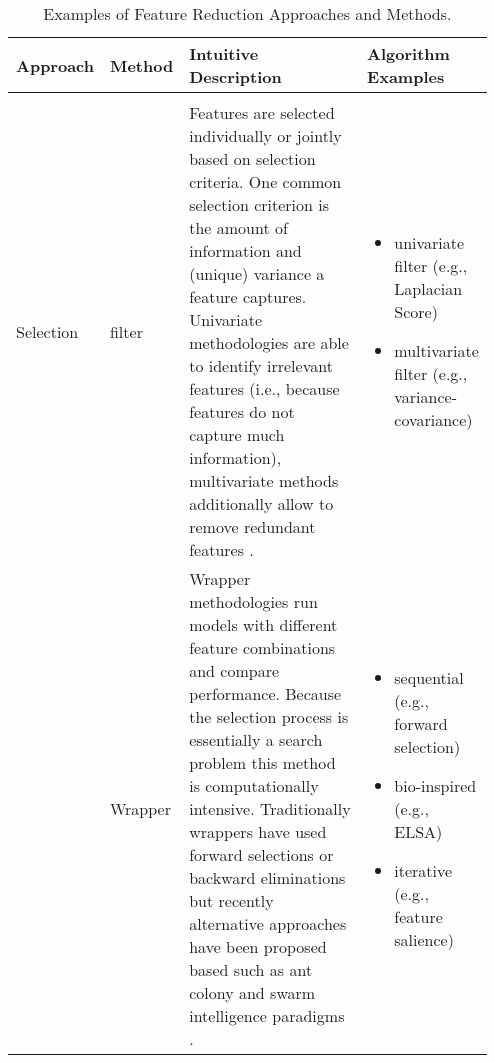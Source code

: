 \begin{sidewaystable*}[!hbtp]
    \centering
    \caption{Examples of Feature Reduction Approaches and Methods.}
    \label{tab:featureReduction} 
    \begin{tabular}{
    >{\raggedright\arraybackslash}p{0.08\linewidth} 
    >{\raggedright\arraybackslash}p{0.08\linewidth} 
    >{\raggedright\arraybackslash}p{0.54\linewidth} 
    >{\raggedright\arraybackslash}p{0.25\linewidth}
    }
        \hline 
        Approach & Method & Intuitive Description & Algorithm Examples \\ 
        \hline \\ [-0.5em]
        
        Selection \linebreak & 
        filter \linebreak & 
        Features are selected individually or jointly based on selection criteria. One common selection criterion is the amount of information and (unique) variance a feature captures. Univariate methodologies are able to identify irrelevant features (i.e., because features do not capture much information), multivariate methods additionally allow to remove redundant features \citep[i.e., because features capture the same information][]{yu2004}. \linebreak &
        \vspace{-1em}
        \begin{itemize}[nosep,leftmargin=*,label={--}]
            \item univariate filter (e.g., Laplacian Score)
            \item multivariate filter (e.g., variance-covariance)
        \end{itemize}
         \linebreak \\ 
        
        \linebreak & 
        Wrapper \linebreak & 
        Wrapper methodologies run models with different feature combinations and compare performance. Because the selection process is essentially a search problem this method is computationally intensive. Traditionally wrappers have used forward selections or backward eliminations but recently alternative approaches have been proposed based such as ant colony and swarm intelligence paradigms \citep[e.g., see][]{tang2014}. \linebreak &
        \vspace{-1em}
        \begin{itemize}[nosep,leftmargin=*,label={--}]
            \item sequential (e.g., forward selection)
            \item bio-inspired (e.g., ELSA)
            \item iterative (e.g., feature salience)
        \end{itemize}
         \linebreak \\ 
        

\end{tabular}
\end{sidewaystable*}

